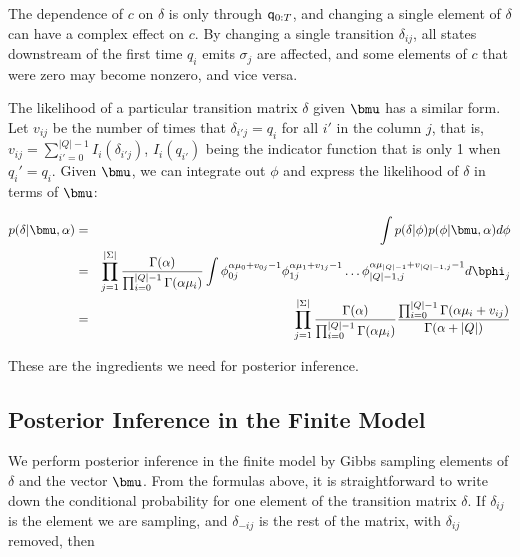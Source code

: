  The dependence of $c$ on $\delta$ is only through $\q_{0:T}$, and changing a single element of $\delta$ can have a complex effect on $c$.  By changing a single transition $\delta_{ij}$, all states downstream of the first time $q_i$ emits $\sigma_j$ are affected, and some elements of $c$ that were zero may become nonzero, and vice versa.
 
 The likelihood of a particular transition matrix $\delta$ given $\bmu$ has a similar form.  Let $v_{ij}$ be the number of times that $\delta_{i'j} = q_i$ for all $i'$ in the column $j$, that is, $v_{ij} = \displaystyle\sum_{i' = 0}^{|Q|-1} I_{i}(\delta_{i'j})$, $I_i(q_{i'})$ being the indicator function that is only 1 when $q_i' = q_i$.  Given $\bmu$, we can integrate out $\phi$ and express the likelihood of $\delta$ in terms of $\bmu$:
 
 \begin{eqnarray}
 p(\delta|\bmu,\alpha) & = & \int p(\delta|\phi)p(\phi|\bmu,\alpha) d\phi \label{delta:factor}\\
  & = & \prod_{j=1}^{|\Sigma|} \frac{\Gamma(\alpha)}{\prod_{i=0}^{|Q|-1}\Gamma(\alpha\mu_i)} \int \phi_{0j}^{\alpha\mu_0+v_{0j}-1} \phi_{1j}^{\alpha\mu_1+v_{1j}-1} \ldots \phi_{|Q|-1,j}^{\alpha\mu_{|Q|-1}+v_{|Q|-1,j}-1} d\bphi_j \label{delta:int}\\
  & = &  \prod_{j=1}^{|\Sigma|} \frac{\Gamma(\alpha)}{\prod_{i=0}^{|Q|-1}\Gamma(\alpha\mu_i)} \frac{\prod_{i=0}^{|Q|-1} \Gamma(\alpha\mu_i + v_{ij})}{\Gamma(\alpha + |Q|)} \label{delta:end}
  \end{eqnarray}



These are the ingredients we need for posterior inference.
 
 \subsection{Posterior Inference in the Finite Model}
 
We perform posterior inference in the finite model by Gibbs sampling elements of $\delta$ and the vector $\bmu$.  From the formulas above, it is straightforward to write down the conditional probability for one element of the transition matrix $\delta$.  If $\delta_{ij}$ is the element we are sampling, and $\delta_{-ij}$ is the rest of the matrix, with $\delta_{ij}$ removed, then

